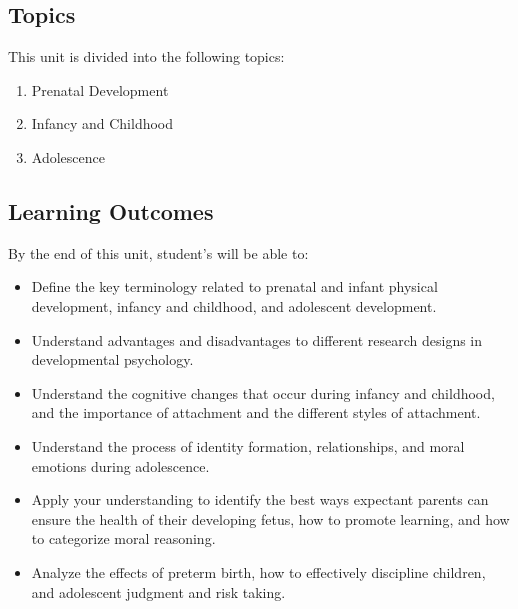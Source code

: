 \documentclass[
]{book}
\providecommand{\tightlist}{%
  \setlength{\itemsep}{0pt}\setlength{\parskip}{0pt}}
\begin{document}
\hypertarget{topics-2}{%
\subsection*{Topics}\label{topics-2}}

This unit is divided into the following topics:

\begin{enumerate}
\def\labelenumi{\arabic{enumi}.}
\tightlist
\item
  Prenatal Development\\
\item
  Infancy and Childhood\\
\item
  Adolescence
\end{enumerate}

\hypertarget{learning-outcomes-2}{%
\subsection*{Learning Outcomes}\label{learning-outcomes-2}}

By the end of this unit, student's will be able to:

\begin{itemize}
\tightlist
\item
  Define the key terminology related to prenatal and infant physical development, infancy and childhood, and adolescent development.\\
\item
  Understand advantages and disadvantages to different research designs in developmental psychology.\\
\item
  Understand the cognitive changes that occur during infancy and childhood, and the importance of attachment and the different styles of attachment.\\
\item
  Understand the process of identity formation, relationships, and moral emotions during adolescence.\\
\item
  Apply your understanding to identify the best ways expectant parents can ensure the health of their developing fetus, how to promote learning, and how to categorize moral reasoning.\\
\item
  Analyze the effects of preterm birth, how to effectively discipline children, and adolescent judgment and risk taking.
\end{itemize}
\end{document}
